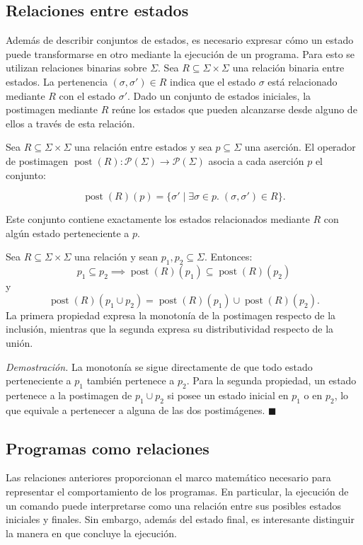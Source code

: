 \documentclass[a4paper,	11pt]{report}
\begin{document}
\subsection*{Relaciones entre estados}
Además de describir conjuntos de estados, es necesario expresar cómo un estado puede transformarse en otro
mediante la ejecución de un programa.
Para esto se utilizan relaciones binarias sobre $\Sigma$.
Sea $R \subseteq \Sigma \times \Sigma$ una relación binaria entre estados.
La pertenencia $(\sigma, \sigma') \in R$ indica que el estado $\sigma$ está relacionado mediante $R$
con el estado $\sigma'$.
Dado un conjunto de estados iniciales,
la postimagen mediante $R$ reúne los estados que pueden alcanzarse desde alguno de ellos a través de esta relación.

\begin{definicion}[Postimagen]
\label{def:post-img}
Sea $R \subseteq \Sigma \times \Sigma$ una relación entre estados y sea $p \subseteq \Sigma$ una aserción.
El operador de postimagen $\operatorname{post}(R) : \mathcal{P}(\Sigma) \rightarrow \mathcal{P}(\Sigma)$
asocia a cada aserción $p$ el conjunto:

$$\operatorname{post}(R)(p) = \{\sigma' \mid \exists \sigma \in p. \; (\sigma, \sigma') \in R\}.$$

Este conjunto contiene exactamente los estados relacionados mediante $R$ con algún estado perteneciente a $p$.
\end{definicion}

\begin{lema}
\label{lem:prop-pi}
Sea $R \subseteq \Sigma \times \Sigma$ una relación y sean $p_1, p_2 \subseteq \Sigma$.
Entonces:
$$p_1 \subseteq p_2 \implies \operatorname{post}(R)(p_1) \subseteq \operatorname{post}(R)(p_2)$$
y
$$\operatorname{post}(R)(p_1 \cup p_2) = \operatorname{post}(R)(p_1) \cup \operatorname{post}(R)(p_2).$$
La primera propiedad expresa la monotonía de la postimagen respecto de la inclusión,
mientras que la segunda expresa su distributividad respecto de la unión.
\end{lema}
\emph{Demostración.} La monotonía se sigue directamente de que todo estado perteneciente a $p_1$ también pertenece a $p_2$.
Para la segunda propiedad,
un estado pertenece a la postimagen de $p_1 \cup p_2$ si posee un estado inicial en $p_1$ o en $p_2$,
lo que equivale a pertenecer a alguna de las dos postimágenes.
$\ensuremath{\blacksquare}$

\subsection*{Programas como relaciones}
Las relaciones anteriores proporcionan el marco matemático necesario para
representar el comportamiento de los programas.
En particular, la ejecución de un comando puede interpretarse como una relación entre
sus posibles estados iniciales y finales.
Sin embargo, además del estado final, es interesante distinguir la manera en que concluye la ejecución.
\end{document}
